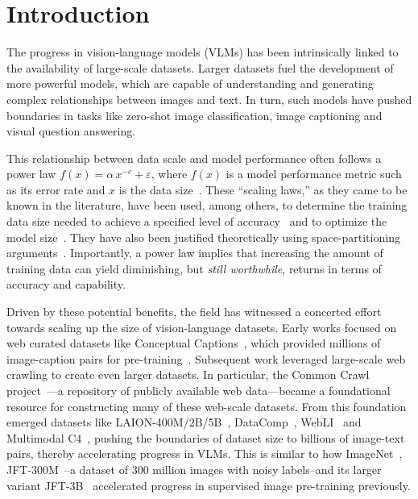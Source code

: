 \section{Introduction}
The progress in vision-language models (VLMs) has been intrinsically linked to the availability of large-scale datasets. Larger datasets fuel the development of more powerful models, which are capable of understanding and generating complex relationships between images and text. In turn, such models have pushed boundaries in tasks like zero-shot image classification, image captioning and visual question answering. 

This relationship between data scale and model performance often follows a power law $f(x)=\alpha\, x^{-c}+\varepsilon$, where $f(x)$ is a model performance metric such as its error rate and $x$ is the data size~\citep{mukherjee2003estimating,hestness2017deep,johnson-etal-2018-predicting,rosenfeld2019constructive,kaplan2020scaling,ghorbani2021scaling,alabdulmohsin2022revisiting,bansal2022data,zhai2106scaling}. These ``scaling laws,'' as they came to be known in the literature, have been used, among others, to determine the training data size needed to achieve a specified level of accuracy~\citep{cho2015much,beleites2013sample,figueroa2012predicting} and to optimize the model size~\citep{kaplan2020scaling,hoffmann2022training,alabdulmohsin2024getting}. They have also been justified theoretically using space-partitioning arguments~\citep{bahri2021explaining,hutter2021learning,sharma2022scaling}. Importantly, a power law implies that increasing the amount of training data can yield diminishing, but \emph{still worthwhile}, returns in terms of accuracy and capability. 

Driven by these potential benefits, the field has witnessed a concerted effort towards scaling up the size of vision-language datasets. Early works focused on web curated datasets like Conceptual Captions~\citep{sharma2018conceptual}, which provided millions of image-caption pairs for pre-training~\cite{sharma2018conceptual}. Subsequent work leveraged large-scale web crawling to create even larger datasets. In particular, the Common Crawl project~\cite{commoncrawl2021}---a repository of publicly available web data---became a foundational resource for constructing many of these web-scale datasets. From this foundation emerged datasets like LAION-400M/2B/5B~\cite{schuhmann2022laion}, DataComp~\cite{datacomp}, WebLI~\cite{chen2022pali} and Multimodal C4~\cite{zhu2024multimodal}, pushing the boundaries of dataset size to billions  of image-text pairs, thereby accelerating progress in VLMs. This is similar to how ImageNet~\cite{deng2009imagenet},  JFT-300M~\cite{sun2017revisiting}--a dataset of 300 million images with noisy labels--and its larger variant JFT-3B~\cite{zhai2106scaling} accelerated progress in supervised image pre-training previously.

